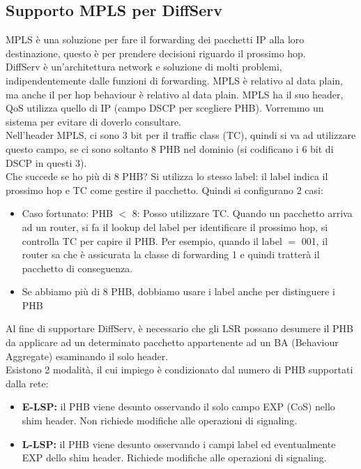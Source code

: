 \documentclass{article}
\begin{document}
\subsection{Supporto MPLS per DiffServ} MPLS è una soluzione per fare il forwarding dei pacchetti IP alla loro destinazione, questo è per prendere decisioni riguardo il prossimo hop. \\ DiffServ è un'architettura network e soluzione di molti problemi, indipendentemente dalle funzioni di forwarding. MPLS è relativo al data plain, ma anche il per hop behaviour è relativo al data plain. MPLS ha il suo header, QoS utilizza quello di IP (campo DSCP per scegliere PHB). Vorremmo un sistema per evitare di doverlo consultare. \\ Nell'header MPLS, ci sono 3 bit per il traffic class (TC), quindi si va ad utilizzare questo campo, se ci sono soltanto 8 PHB nel dominio (si codificano i 6 bit di DSCP in questi 3). \\ Che succede se ho più di 8 PHB? Si utilizza lo stesso label: il label indica il prossimo hop e TC come gestire il pacchetto. Quindi si configurano 2 casi:
\begin{itemize}
    \item Caso fortunato: PHB $<$ 8: Posso utilizzare TC. Quando un pacchetto arriva ad un router, si fa il lookup del label per identificare il prossimo hop, si controlla TC per capire il PHB. Per esempio, quando il label $=$ 001, il router sa che è assicurata la classe di forwarding 1 e quindi tratterà il pacchetto di conseguenza.
    \item Se abbiamo più di 8 PHB, dobbiamo usare i label anche per distinguere i PHB
\end{itemize}
Al fine di supportare DiffServ, è necessario che gli LSR possano desumere il PHB da applicare ad un determinato pacchetto appartenente ad un BA (Behaviour Aggregate) esaminando il solo header. \\ Esistono 2 modalità, il cui impiego è condizionato dal numero di PHB supportati dalla rete: 
\begin{itemize}
    \item \textbf{E-LSP:} il PHB viene desunto osservando il solo campo EXP (CoS) nello shim header. Non richiede modifiche alle operazioni di signaling.
    \item \textbf{L-LSP:} il PHB viene desunto osservando i campi label ed eventualmente EXP dello shim header. Richiede modifiche alle operazioni di signaling.
\end{itemize}
\end{document}
